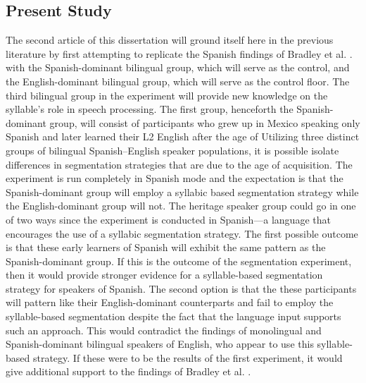 \documentclass[
12pt, %
english, %
doublespacing, %
nolistspacing, %
liststotoc, %
headsepline, %
chapterinoneline, %
openany, %
]{DoctoralThesis}\usepackage[]{graphicx}\usepackage[]{color}
\begin{document}
\subsection{Present Study}
The second article of this dissertation will ground itself here in the previous literature by first attempting to replicate the Spanish findings of Bradley et al. \parencite*{Bradley1993-qq}. with the Spanish-dominant bilingual group, which will serve as the control, and the English-dominant bilingual group, which will serve as the control floor. The third bilingual group in the experiment will provide new knowledge on the syllable’s role in speech processing.  The first group, henceforth the Spanish-dominant group, will consist of participants who grew up in Mexico speaking only Spanish and later learned their L2 English after the age of %
Utilizing three distinct groups of bilingual Spanish--English speaker populations, it is possible isolate differences in segmentation strategies that are due to the age of acquisition. The experiment is run completely in Spanish mode and the expectation is that the Spanish-dominant group will employ a syllabic based segmentation strategy while the English-dominant group will not. The heritage speaker group could go in one of two ways since the experiment is conducted in Spanish---a language that encourages the use of a syllabic segmentation strategy. The first possible outcome is that these early learners of Spanish will exhibit the same pattern as the Spanish-dominant group. If this is the outcome of the segmentation experiment, then it would provide stronger evidence for a syllable-based segmentation strategy for speakers of Spanish. The second option is that the these participants will pattern like their English-dominant counterparts and fail to employ the syllable-based segmentation despite the fact that the language input supports such an approach. This would contradict the findings of monolingual and Spanish-dominant bilingual speakers of English, who appear to use this syllable-based strategy. If these were to be the results of the first experiment, it would give additional support to the findings of Bradley et al. \parencite{Bradley1993-qq}. 
\end{document}
